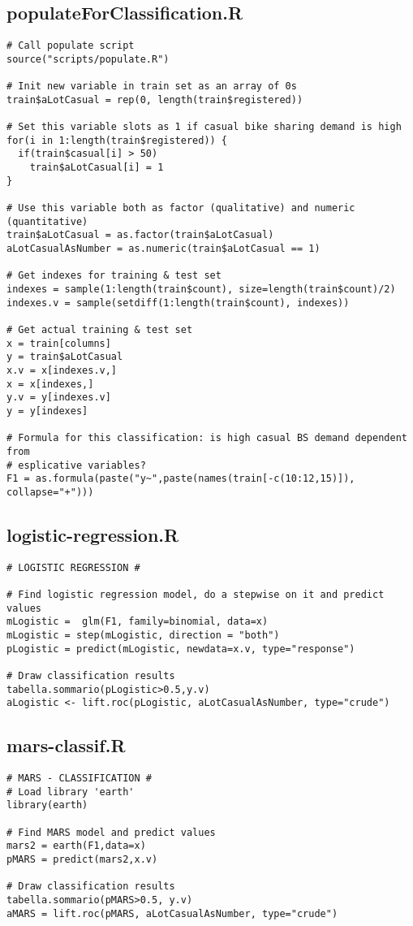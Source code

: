 \subsection{populateForClassification.R}\label{sec:script-populate-class}
\begin{verbatim}
# Call populate script
source("scripts/populate.R")

# Init new variable in train set as an array of 0s
train$aLotCasual = rep(0, length(train$registered))

# Set this variable slots as 1 if casual bike sharing demand is high
for(i in 1:length(train$registered)) {
  if(train$casual[i] > 50)
    train$aLotCasual[i] = 1
}

# Use this variable both as factor (qualitative) and numeric (quantitative)
train$aLotCasual = as.factor(train$aLotCasual)
aLotCasualAsNumber = as.numeric(train$aLotCasual == 1)

# Get indexes for training & test set
indexes = sample(1:length(train$count), size=length(train$count)/2)
indexes.v = sample(setdiff(1:length(train$count), indexes))

# Get actual training & test set
x = train[columns]
y = train$aLotCasual
x.v = x[indexes.v,]
x = x[indexes,]
y.v = y[indexes.v]
y = y[indexes]

# Formula for this classification: is high casual BS demand dependent from
# esplicative variables?
F1 = as.formula(paste("y~",paste(names(train[-c(10:12,15)]), collapse="+")))
\end{verbatim}

\subsection{logistic-regression.R}\label{sec:script-log-reg}
\begin{verbatim}
# LOGISTIC REGRESSION #

# Find logistic regression model, do a stepwise on it and predict values
mLogistic =  glm(F1, family=binomial, data=x)
mLogistic = step(mLogistic, direction = "both")
pLogistic = predict(mLogistic, newdata=x.v, type="response")

# Draw classification results
tabella.sommario(pLogistic>0.5,y.v)
aLogistic <- lift.roc(pLogistic, aLotCasualAsNumber, type="crude")
\end{verbatim}

\subsection{mars-classif.R}\label{sec:script-mars-classif}
\begin{verbatim}
# MARS - CLASSIFICATION #
# Load library 'earth'
library(earth)

# Find MARS model and predict values
mars2 = earth(F1,data=x)
pMARS = predict(mars2,x.v)

# Draw classification results
tabella.sommario(pMARS>0.5, y.v)
aMARS = lift.roc(pMARS, aLotCasualAsNumber, type="crude")
\end{verbatim}

